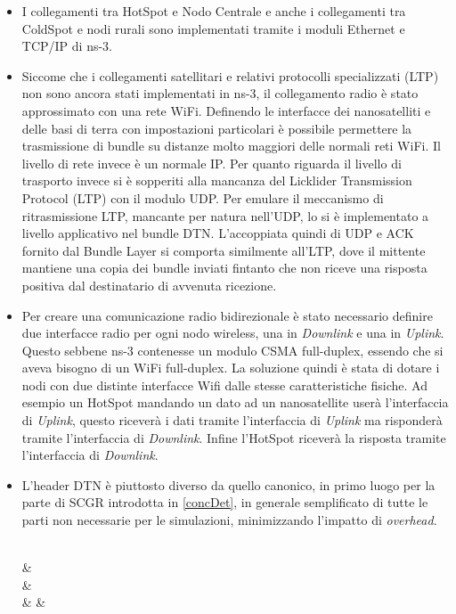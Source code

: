\documentclass[12pt,a4paper,oneside]{book}
\begin{document}
		\begin{itemize}
			\item I collegamenti tra HotSpot e Nodo Centrale e anche i collegamenti tra ColdSpot e nodi rurali sono implementati tramite i moduli Ethernet e TCP/IP di ns-3.
			
			\item Siccome che i collegamenti satellitari e relativi protocolli specializzati (LTP) non sono ancora stati implementati in ns-3, il collegamento radio è stato approssimato con una rete WiFi. Definendo le interfacce dei nanosatelliti e delle basi di terra con impostazioni particolari è possibile permettere la trasmissione di bundle su distanze molto maggiori delle normali reti WiFi. Il livello di rete invece è un normale IP. Per quanto riguarda il livello di trasporto invece si è sopperiti alla mancanza del Licklider Transmission Protocol (LTP) con il modulo UDP. Per emulare il meccanismo di ritrasmissione LTP, mancante per natura nell'UDP, lo si è implementato a livello applicativo nel bundle DTN. L'accoppiata quindi di UDP e ACK fornito dal Bundle Layer si comporta similmente all'LTP, dove il mittente mantiene una copia dei bundle inviati fintanto che non riceve una risposta positiva dal destinatario di avvenuta ricezione. 
			
			\item Per creare una comunicazione radio bidirezionale è stato necessario definire due interfacce radio per ogni nodo wireless, una in {\it Downlink} e una in {\it Uplink}. Questo sebbene ns-3 contenesse un modulo CSMA full-duplex, essendo che si aveva bisogno di un WiFi full-duplex. La soluzione quindi è stata di dotare i nodi con due distinte interfacce Wifi dalle stesse caratteristiche fisiche. Ad esempio un HotSpot mandando un dato ad un nanosatellite userà l'interfaccia di {\it Uplink}, questo riceverà i dati tramite l'interfaccia di {\it Uplink} ma risponderà tramite l'interfaccia di {\it Downlink}. Infine l'HotSpot riceverà la risposta tramite l'interfaccia di {\it Downlink}.
			\item L'header DTN è piuttosto diverso da quello canonico, in primo luogo per la parte di SCGR introdotta in \ref{concDet}, in generale semplificato di tutte le parti non necessarie per le simulazioni, minimizzando l'impatto di {\it overhead}.
			
			\vspace{25pt}
			\begin{bytefield}[bitwidth=0.5em]{64}
				 \\
				  &  \\
				 &  \\
				 &  &  \\
				

\end{bytefield}
\end{itemize}
\end{document}
